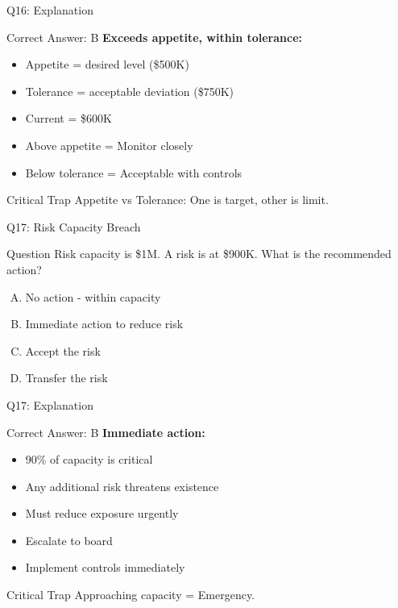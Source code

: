 \documentclass{beamer}
\begin{document}
			\begin{frame}{Q16: Explanation}
				\begin{block}{Correct Answer: B}
					\textbf{Exceeds appetite, within tolerance:}
					\begin{itemize}
						\item Appetite = desired level (\$500K)
						\item Tolerance = acceptable deviation (\$750K)
						\item Current = \$600K
						\item Above appetite = Monitor closely
						\item Below tolerance = Acceptable with controls
					\end{itemize}
				\end{block}
				\begin{alertblock}{Critical Trap}
					Appetite vs Tolerance: One is target, other is limit.
				\end{alertblock}
			\end{frame}
			
			\begin{frame}{Q17: Risk Capacity Breach}
				\begin{block}{Question}
					Risk capacity is \$1M. A risk is at \$900K. What is the recommended action?
				\end{block}
				\begin{enumerate}[(A)]
					\item No action - within capacity
					\item Immediate action to reduce risk
					\item Accept the risk
					\item Transfer the risk
				\end{enumerate}
			\end{frame}
			
			\begin{frame}{Q17: Explanation}
				\begin{block}{Correct Answer: B}
					\textbf{Immediate action:}
					\begin{itemize}
						\item 90\% of capacity is critical
						\item Any additional risk threatens existence
						\item Must reduce exposure urgently
						\item Escalate to board
						\item Implement controls immediately
					\end{itemize}
				\end{block}
				\begin{alertblock}{Critical Trap}
					Approaching capacity = Emergency.
				\end{alertblock}
			\end{frame}
			
\end{document}
